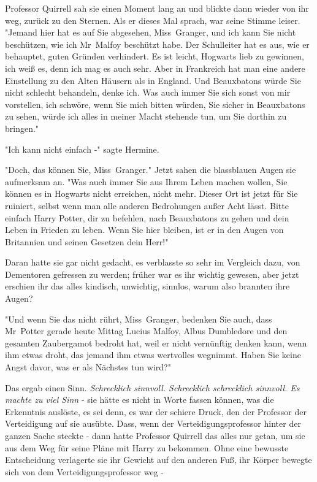 {Professor Quirrell sah sie einen Moment lang an und blickte dann wieder von ihr weg, zurück zu den Sternen. Als er dieses Mal sprach, war seine Stimme leiser. "Jemand hier hat es auf Sie abgesehen, Miss~Granger, und ich kann Sie nicht beschützen, wie ich Mr~Malfoy beschützt habe. Der Schulleiter hat es aus, wie er behauptet, guten Gründen verhindert. Es ist leicht, Hogwarts lieb zu gewinnen, ich weiß es, denn ich mag es auch sehr. Aber in Frankreich hat man eine andere Einstellung zu den Alten Häusern als in England. Und Beauxbatons würde Sie nicht schlecht behandeln, denke ich. Was auch immer Sie sich sonst von mir vorstellen, ich schwöre, wenn Sie mich bitten würden, Sie sicher in Beauxbatons zu sehen, würde ich alles in meiner Macht stehende tun, um Sie dorthin zu bringen."

"Ich kann nicht einfach -" sagte Hermine.

"Doch, das können Sie, Miss~Granger." Jetzt sahen die blassblauen Augen sie aufmerksam an. "Was auch immer Sie aus Ihrem Leben machen wollen, Sie können es in Hogwarts nicht erreichen, nicht mehr. Dieser Ort ist jetzt für Sie ruiniert, selbst wenn man alle anderen Bedrohungen außer Acht lässt. Bitte einfach Harry Potter, dir zu befehlen, nach Beauxbatons zu gehen und dein Leben in Frieden zu leben. Wenn Sie hier bleiben, ist er in den Augen von Britannien und seinen Gesetzen dein Herr!"

Daran hatte sie gar nicht gedacht, es verblasste so sehr im Vergleich dazu, von Dementoren gefressen zu werden; früher war es ihr wichtig gewesen, aber jetzt erschien ihr das alles kindisch, unwichtig, sinnlos, warum also brannten ihre Augen?

"Und wenn Sie das nicht rührt, Miss~Granger, bedenken Sie auch, dass Mr~Potter gerade heute Mittag Lucius Malfoy, Albus Dumbledore und den gesamten Zaubergamot bedroht hat, weil er nicht vernünftig denken kann, wenn ihm etwas droht, das jemand ihm etwas wertvolles wegnimmt. Haben Sie keine Angst davor, was er als Nächstes tun wird?"

Das ergab einen Sinn. \emph{Schrecklich sinnvoll. Schrecklich schrecklich sinnvoll. Es machte zu viel Sinn} - sie hätte es nicht in Worte fassen können, was die Erkenntnis auslöste, es sei denn, es war der schiere Druck, den der Professor der Verteidigung auf sie ausübte. Dass, wenn der Verteidigungsprofessor hinter der ganzen Sache steckte - dann hatte Professor Quirrell das alles nur getan, um sie aus dem Weg für seine Pläne mit Harry zu bekommen. Ohne eine bewusste Entscheidung verlagerte sie ihr Gewicht auf den anderen Fuß, ihr Körper bewegte sich von dem Verteidigungsprofessor weg -

}
